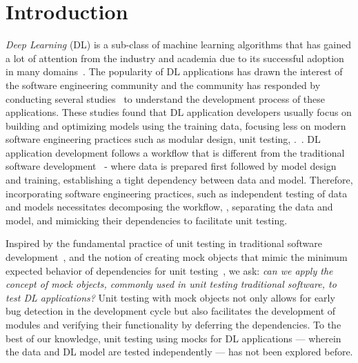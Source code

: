 \section{Introduction}
\label{sec:intro}

\textit{Deep Learning} (DL) is a sub-class of machine learning algorithms that has gained a lot of attention from the industry and academia due to its successful adoption in many domains~\cite{Csaky19,Iannizzotto18,Roy18}.
The popularity of DL applications has drawn the interest of the software engineering community and the community has responded by conducting several studies~\cite{zhang2019,Zhang2020,islam19,humbatova20taxonomy,zhang18,cao2022understanding,rahman2023machine} to understand the development process of these applications.
These studies found that DL application developers usually focus on building and optimizing models using the training data, focusing less on modern software engineering practices such as modular design, unit testing, \etc.~\cite{Zhang2020, pan2020decomposing, pan2022decomposing}.
DL application development follows a workflow that is different from the traditional software development~\cite{zhang2019, biswas22art, Amershi2019} - where data is prepared first followed by model design and training, establishing a tight dependency between data and model.
Therefore, incorporating software engineering practices, such as independent testing of data and models necessitates decomposing the workflow, \ie, separating the data and model, and mimicking their dependencies to facilitate unit testing.


Inspired by the fundamental practice of unit testing in traditional software development~\cite{binder2000testing}, and the notion of creating mock objects that mimic the minimum expected behavior of dependencies for unit testing~\cite{mackinnon2000endotesting}, we ask: 
\textit{can we apply the concept of mock objects, commonly used in unit testing traditional software, to test DL applications?}
Unit testing with mock objects not only allows for early bug detection in the development cycle but also facilitates the development of modules and verifying their functionality by deferring the dependencies.
To the best of our knowledge, unit testing using mocks for DL applications — wherein the data and DL model are tested independently — has not been explored before. 


